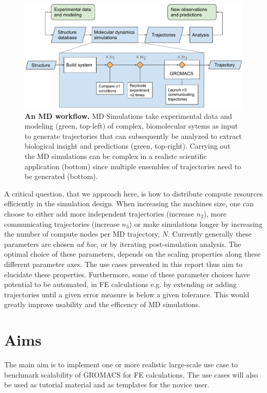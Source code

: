 \documentclass[11pt,a4paper]{article}
\begin{document}
\begin{figure}[thbp!]
\includegraphics[width=1\textwidth]{figs/md-workflow.pdf}
\caption{\label{fig:mdworkflow}
\textbf{An MD workflow.} 
MD Simulations take experimental data and modeling (green, top-left) of complex, biomolecular sytems as input to generate trajectories that can subsequently be analyzed to extract biological insight and predictions (green, top-right). Carrying out the MD simulations can be complex in a realistc scientific application (bottom) since multiple ensembles of trajectories need to be generated (bottom). 
}
\end{figure}

A critical question, that we approach here, is how to distribute compute resources efficiently in the simulation design. 
When increasing the machines size, one can choose to either add more independent trajectories (increase $n_2$), more communicating trajectories (increase $n_3$) or make simulations longer by increasing the number of compute nodes per MD trajectory,  $N$. Currently generally these parameters are chosen \textit{ad hoc}, or by iterating  post-simulation analysis.
The optimal choice of these parameters, depends on the scaling properties along these different parameter axes. The use cases presented in this report thus aim to  elucidate these properties.
Furthermore, some of these parameter choices have potential to be automated, in FE calculations e.g. by extending or adding trajectories until a given error measure is below a given tolerance. This would greatly improve usability and the efficency of MD simulations. 

\section{Aims}
The main aim is to implement one or more realistic large-scale use case to benchmark scalability of GROMACS for FE calculations. The use cases will also be used as tutorial material and as templates for the novice user. 
\end{document}
